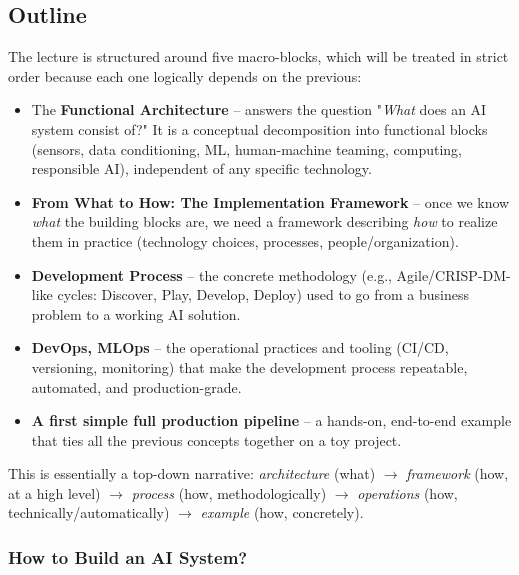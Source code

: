 \subsection{Outline}

The lecture is structured around five macro-blocks, which will be treated in strict order because each one logically depends on the previous:

\begin{itemize}
    \item The \textbf{Functional Architecture} -- answers the question "\emph{What} does an AI system consist of?" It is a conceptual decomposition into functional blocks (sensors, data conditioning, ML, human-machine teaming, computing, responsible AI), independent of any specific technology.
    \vspace{0.2cm}
    \item \textbf{From What to How: The Implementation Framework} -- once we know \emph{what} the building blocks are, we need a framework describing \emph{how} to realize them in practice (technology choices, processes, people/organization).
    \vspace{0.2cm}
    \item \textbf{Development Process} -- the concrete methodology (e.g., Agile/CRISP-DM-like cycles: Discover, Play, Develop, Deploy) used to go from a business problem to a working AI solution.
    \vspace{0.2cm}
    \item \textbf{DevOps, MLOps} -- the operational practices and tooling (CI/CD, versioning, monitoring) that make the development process repeatable, automated, and production-grade.
    \vspace{0.2cm}
    \item \textbf{A first simple full production pipeline} -- a hands-on, end-to-end example that ties all the previous concepts together on a toy project.
\end{itemize}

This is essentially a top-down narrative: \emph{architecture} (what) $\rightarrow$ \emph{framework} (how, at a high level) $\rightarrow$ \emph{process} (how, methodologically) $\rightarrow$ \emph{operations} (how, technically/automatically) $\rightarrow$ \emph{example} (how, concretely).

\subsubsection*{ How to Build an AI System?}

